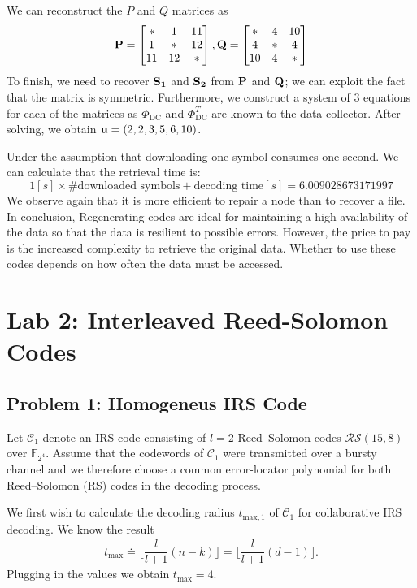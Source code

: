 \documentclass{article}
\begin{document}
We can reconstruct the $P$ and $Q$ matrices as
\begin{equation*}
\vb{P}=
\begin{bmatrix}
* & 1 & 11 \\
1 & * & 12 \\
11 & 12 & *
\end{bmatrix},
\vb{Q}=
\begin{bmatrix}
* & 4 & 10 \\
4 & * & 4 \\
10 & 4 & *
\end{bmatrix}
\end{equation*}
To finish, we need to recover $\vb{S_1}$ and $\vb{S_2}$ from $\vb{P}$ and $\vb{Q}$; we can exploit the fact that the matrix is symmetric. Furthermore, we construct a system of 3 equations for each of the matrices as $\Phi_{\text{DC}}$ and $\Phi_{\text{DC}}^T$ are known to the data-collector. After solving, we obtain $\vb{u} = (2, 2, 3, 5, 6, 10)$.

Under the assumption that downloading one symbol consumes one second. We can calculate that the retrieval time is:
\begin{equation*}
1[s] \times \text{\#downloaded symbols} + \text{decoding time}[s] = 6.009028673171997
\end{equation*}
We observe again that it is more efficient to repair a node than to recover a file. In conclusion, Regenerating codes are ideal for maintaining a high availability of the data so that the data is resilient to possible errors. However, the price to pay is the increased complexity to retrieve the original data. Whether to use these codes depends on how often the data must be accessed.

\section*{Lab 2: Interleaved Reed-Solomon Codes}

\subsection*{Problem 1: Homogeneus IRS Code}
Let $\mathcal{C}_1$ denote an IRS code consisting of $l = 2$ Reed–Solomon codes $\mathcal{RS}(15, 8)$ over $\mathbb{F}_{2^4}$.
Assume that the codewords of $\mathcal{C}_1$ were transmitted over a bursty channel and we therefore choose a common error-locator polynomial for both Reed–Solomon (RS) codes in the decoding process.

We first wish to calculate the decoding radius $t_{\text{max},1}$ of $\mathcal{C}_1$ for collaborative IRS decoding. We know the result
\begin{align*}
t_{\text{max}} \doteq \lfloor \dfrac{l}{l+1}(n-k) \rfloor = \lfloor \dfrac{l}{l+1}(d-1) \rfloor.
\end{align*}
Plugging in the values we obtain $t_{\text{max}} = 4$.
\end{document}
